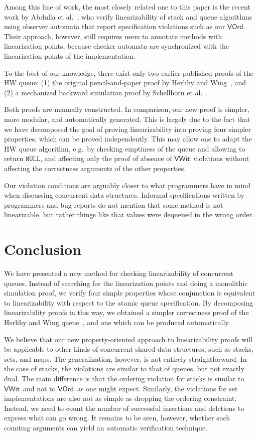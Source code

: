 \documentclass{LMCS}
\newcommand{\NULL}{\ensuremath{\mathtt{NULL}}}
\newcommand{\VOrd}{\ensuremath{\mathsf{VOrd}}}
\newcommand{\VWit}{\ensuremath{\mathsf{VWit}}}
\begin{document}
Among this line of work, the most closely related one to this paper is the
recent work by Abdulla et al.~\cite{AHH+2013}, 
who verify linearizability of stack and queue algorithms using observer
automata that report specification violations such as our \VOrd. 
Their approach, however, still requires users to annotate methods
with linearization points, because checker automata are synchronized with the
linearization points of the implementation.

To the best of our knowledge, there exist only two earlier published proofs 
of the HW queue: (1) the original pencil-and-paper proof by Herlihy and
Wing~\cite{HW1990}, and (2) a mechanized backward simulation proof by
Schellhorn et al.~\cite{SWD2012}.

Both proofs are manually constructed. In comparison,  our new proof 
is simpler, more modular, and automatically generated.
This is largely due to the fact that we have decomposed the goal of proving
linearizability into proving four simpler properties,
which can be proved independently.
This may allow one to adapt the HW queue algorithm, e.g.\ by checking
emptiness of the queue and allowing  to return \NULL, and affecting
only the proof of absence of \VWit\ violations without affecting the
correctness arguments of the other properties. 

Our violation conditions are arguably closer to what programmers have
in mind when discussing concurrent data structures.  Informal specifications 
written by programmers and bug reports do not mention that some method is 
not linearizable, but rather things like that values were dequeued in the wrong
order.

\section{Conclusion}
\label{sec:conclusion}

We have presented a new method for checking linearizability of concurrent queues.
Instead of searching for the linearization points and doing a monolithic simulation proof, we verify four simple properties whose conjunction is equivalent to linearizability with respect to the atomic queue specification.
By decomposing linearizability proofs in this way, we obtained a simpler correctness proof of the Herlihy and Wing queue~\cite{HW1990}, and one which can be produced automatically.

We believe that our new property-oriented approach to linearizability proofs
will be applicable to other kinds of concurrent shared data structures, such as
stacks, sets, and maps.
The generalization, however, is not entirely straightforward.  In the case of
stacks, the violations are similar to that of queues, but not exactly dual. 
The main difference is that the ordering violation for stacks is similar to
\VWit\ and not to \VOrd\ as one might expect.
Similarly, the violations for set implementations are also not as simple as
dropping the ordering constraint.  Instead, we need to count the number of
successful insertions and deletions to express what can go wrong.  It remains
to be seen, however, whether such counting arguments can yield an automatic
verification technique. 
\end{document}
